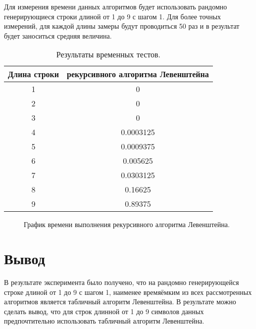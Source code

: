Для измерения времени данных алгоритмов будет использовать рандомно генерирующиеся строки длиной от 1 до 9 с шагом 1. Для более точных измерений, для каждой длины замеры будут проводиться 50 раз и в результат будет заноситься средняя величина.
\newpage
\begin{table}[h!]
  \begin{center}
 \captionsetup{justification=raggedright}
    \caption{Результаты временных тестов.}
    \label{tab:table4}
    \begin{tabular}{c|c}
	\textbf{Длина строки} & \textbf{рекурсивного алгоритма Левенштейна}\\
      \hline
	1 & 0\\
	2 & 0\\
	3 & 0\\
	4 & 0.0003125\\
	5 & 0.0009375\\
	6 & 0.005625\\
	7 & 0.0303125\\
	8 & 0.16625\\
	9 & 0.89375\\
    \end{tabular}
  \end{center}
\end{table}

\begin{figure}[ph!]
	\caption{График времени выполнения рекурсивного алгоритма Левенштейна.}
\end{figure}

\section{Вывод}
В результате эксперимента было получено, что на рандомно генерирующейся строке длиной от 1 до 9 с шагом 1, наименее времяёмким из всех рассмотренных алгоритмов является табличный алгоритм Левенштейна. В результате можно сделать вывод, что для строк длинной от 1 до 9 символов данных предпочтительно использовать табличный алгоритм Левенштейна.